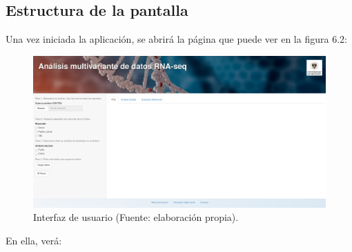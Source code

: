 \subsection{Estructura de la pantalla}

Una vez iniciada la aplicación, se abrirá la página que puede ver en la figura 6.2:

\begin{figure}[h]
    \centering
    \includegraphics[width=1\textwidth]{../img/app-general.png}
    \caption{Interfaz de usuario (Fuente: elaboración propia).}
\end{figure}

En ella, verá:

